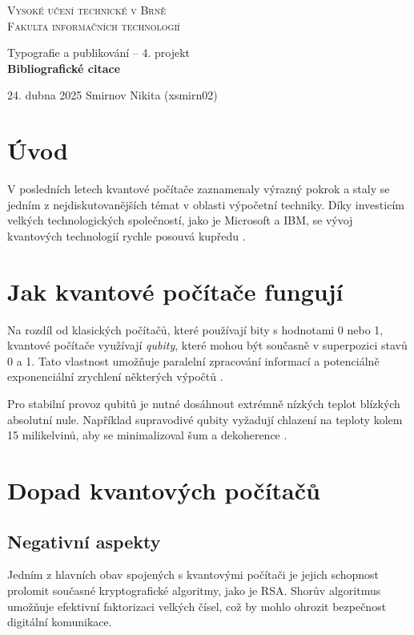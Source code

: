 \documentclass[a4paper,11pt]{article}
\begin{document}
\thispagestyle{empty}
\begin{center}
    \Huge \textsc{Vysoké učení technické v Brně}\\
    \huge\textsc{Fakulta informačních technologií}\\
    
    
    Typografie a publikování -- 4. projekt\\
    \textbf{Bibliografické citace}\\
    
\end{center}

{\LARGE 24. dubna 2025 \hfill Smirnov Nikita (xsmirn02)}
\clearpage

\setcounter{page}{1}

\section{Úvod}
V posledních letech kvantové počítače zaznamenaly výrazný pokrok a staly se jedním z nejdiskutovanějších témat v oblasti výpočetní techniky. Díky investicím velkých technologických společností, jako je Microsoft a IBM, se vývoj kvantových technologií rychle posouvá kupředu \cite{novinky2025qcvyvoj}.

\section{Jak kvantové počítače fungují}
Na rozdíl od klasických počítačů, které používají bity s hodnotami 0 nebo 1, kvantové počítače využívají \emph{qubity}, které mohou být současně v superpozici stavů 0 a 1. Tato vlastnost umožňuje paralelní zpracování informací a potenciálně exponenciální zrychlení některých výpočtů \cite{nielsen2000quantum}.

Pro stabilní provoz qubitů je nutné dosáhnout extrémně nízkých teplot blízkých absolutní nule. Například supravodivé qubity vyžadují chlazení na teploty kolem 15 milikelvinů, aby se minimalizoval šum a dekoherence \cite{gruska2003quantum}.

\section{Dopad kvantových počítačů}

\subsection{Negativní aspekty}
Jedním z hlavních obav spojených s kvantovými počítači je jejich schopnost prolomit současné kryptografické algoritmy, jako je RSA. Shorův algoritmus\cite{shor1994algo} umožňuje efektivní faktorizaci velkých čísel, což by mohlo ohrozit bezpečnost digitální komunikace.
\end{document}
